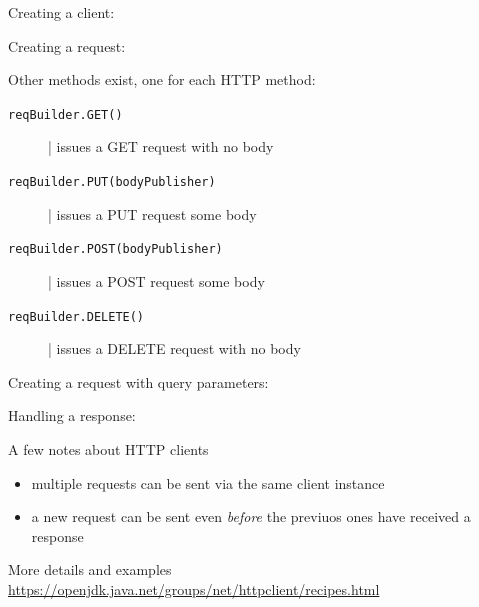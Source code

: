 \documentclass[presentation]{beamer}\mode<presentation>{\usetheme{AMSBolognaFC}}
\begin{document}
\begin{frame}[allowframebreaks]
    Creating a client:
    

    \framebreak

    Creating a request:
    

    \framebreak

    Other methods exist, one for each HTTP method:
    \begin{description}
        \item[\texttt{reqBuilder.GET()}] | issues a GET request with no body
        \item[\texttt{reqBuilder.PUT(bodyPublisher)}] | issues a PUT request some body
        \item[\texttt{reqBuilder.POST(bodyPublisher)}] | issues a POST request some body
        \item[\texttt{reqBuilder.DELETE()}] | issues a DELETE request with no body
    \end{description}

    \framebreak

    Creating a request with query parameters:
    

    \framebreak

    Handling a response:
    

    \framebreak

    \begin{alertblock}{A few notes about HTTP clients}
        \begin{itemize}
            \item multiple requests can be sent via the same client instance
            \item a new request can be sent even \emph{before} the previuos ones have received a response
        \end{itemize}
    \end{alertblock}

    \bigskip

    \begin{exampleblock}{More details and examples}\centering
        \url{https://openjdk.java.net/groups/net/httpclient/recipes.html}
    \end{exampleblock}

\end{frame}
\end{document}
